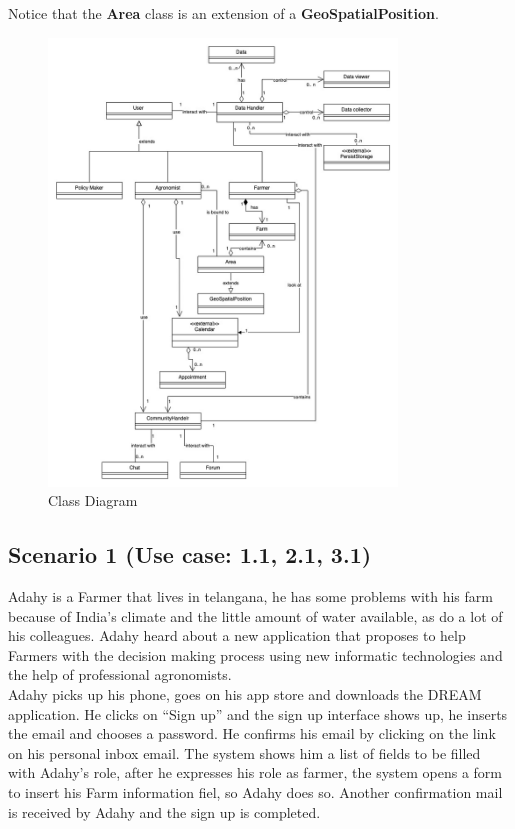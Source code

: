 \documentclass[10pt]{report}
\begin{document}
Notice that the \textbf{Area} class is an extension of a \textbf{GeoSpatialPosition}.
\begin{figure}[H]
    \centering
    \includegraphics[width=350px]{Class diagram/Class-diagram.jpg}
    \caption{Class Diagram}
\end{figure}

\subsection{Scenario 1 (Use case: 1.1, 2.1, 3.1)}
Adahy is a Farmer that lives in telangana, he has some problems with his farm because of India's climate and the little amount of water available, as do a lot of his colleagues. Adahy heard about a new application that proposes to help Farmers with the decision making process using new informatic technologies and the help of professional agronomists.\\
Adahy picks up his phone, goes on his app store and downloads the DREAM application. He clicks on “Sign up” and the sign up interface shows up, he inserts the email and chooses a password. He confirms his email by clicking on the link on his personal inbox email. The system shows him a list of fields to be filled with Adahy’s role, after he expresses his role as farmer, the system opens a form to insert his Farm information fiel, so Adahy does so. Another confirmation mail is received by Adahy and the sign up is completed.
\end{document}
